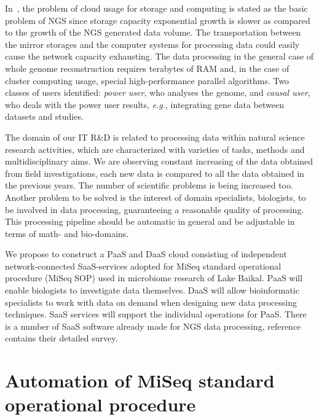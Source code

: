 \documentclass[a4paper]{jpconf}
\begin{document}
In~\cite{guo16}, the problem of cloud usage for storage and computing is stated as the basic problem of NGS since storage capacity exponential growth is slower as compared to the growth of the NGS generated data volume. The transportation between the mirror storages and the computer systems for processing data could easily cause the network capacity exhausting. The data processing in the general case of whole genome reconstruction requires terabytes of RAM and, in the case of cluster computing usage, special high-performance parallel algorithms. Two classes of users identified: \emph{power user}, who analyses the genome, and \emph{causal user}, who deals with the power user results, \emph{e.g.}, integrating gene data between datasets and studies.



The domain of our IT R\&D is related to processing data within natural science research activities, which are characterized with varieties of tasks, methods and multidisciplinary aims. %
We are observing constant increasing of the data obtained from field investigations, each new data is compared to all the data obtained in the previous years. The number of scientific problems is being increased too. Another problem to be solved is the interest of domain specialists, biologists, to be involved in data processing, guaranteeing a reasonable quality of processing.  This processing pipeline should be automatic in general and be adjustable in terms of math- and bio-domains.

We propose to construct a PaaS and DaaS cloud consisting of independent network-connected SaaS-services adopted for MiSeq standard operational procedure (MiSeq SOP) used in microbiome research of Lake Baikal. PaaS will enable biologists to investigate data themselves. DaaS will allow bioinformatic specialists to work with data on demand when designing new data processing techniques. SaaS services will support the individual operations for PaaS. There is a number of SaaS software already made for NGS data processing, reference~\cite{guo16} contains their detailed survey. %


\section{Automation of MiSeq standard operational procedure}\label{sec:sop}
\end{document}
